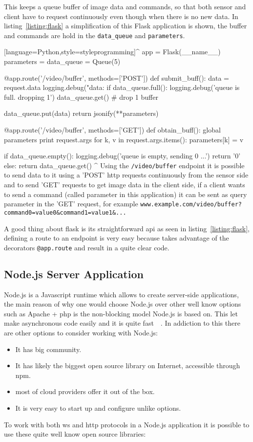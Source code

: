 \documentclass[hidelinks,11pt,a4paper,oneside,article]{memoir}
\begin{document}
This keeps a queue buffer of image data and commands, so that both sensor and client have to request continuously even though when there is no new data. In listing~\ref{listing:flask} a simplification of this Flask application is shown, the buffer and commands are hold in the \texttt{data\_queue} and \texttt{parameters}.

[language=Python,style=styleprogramming]^
app = Flask(__name__)
parameters = {}
data_queue = Queue(5)

@app.route('/video/buffer', methods=['POST'])
def submit_buff():
    data = request.data
    logging.debug("data:%
    if data_queue.full():
        logging.debug('queue is full. dropping 1')
        data_queue.get() # drop 1 buffer
    
    data_queue.put(data)
    return jsonify(**parameters)


@app.route('/video/buffer', methods=['GET'])
def obtain_buff():
    global parameters
    print request.args
    for k, v in request.args.items():
        parameters[k] = v
        
    if data_queue.empty():
        logging.debug('queue is empty, sending 0 ...')
        return '0'
    else:
        return data_queue.get()
^
Using the \texttt{/video/buffer} endpoint it is possible to send data to it using a 'POST' \gls{http} requests continuously from the sensor side and to send 'GET' requests to get image data in the client side, if a client wants to send a command (called parameter in this application) it can be sent as query parameter in the 'GET' request, for example \texttt{www.example.com/video/buffer?command0=value0\&command1=value1\&...}

A good thing about flask is its straightforward \gls{api} as seen in listing~\ref{listing:flask}, defining a route to an endpoint is very easy because takes advantage of the decorators \texttt{@app.route} and result in a quite clear code.

\subsection{Node.js Server Application}
Node.js is a Javascript runtime which allows to create server-side applications, the main reason of why one would choose Node.js over other well know options such as Apache + \gls{php} is the non-blocking model Node.js is based on. This let make asynchronous code easily and it is quite fast~\cite[p.12]{nodejs}~\cite{nodeblocking}.
In addiction to this there are other options to consider working with Node.js:
\begin{itemize}
    \item It has big community.
    \item It has likely the biggest open source library on Internet, accessible through \gls{npm}.
    \item most of cloud providers offer it out of the box.
    \item It is very easy to start up and configure unlike options.
\end{itemize}
To work with both \gls{ws} and \gls{http} protocols in a Node.js application it is possible to use these quite well know open source libraries:
\end{document}
